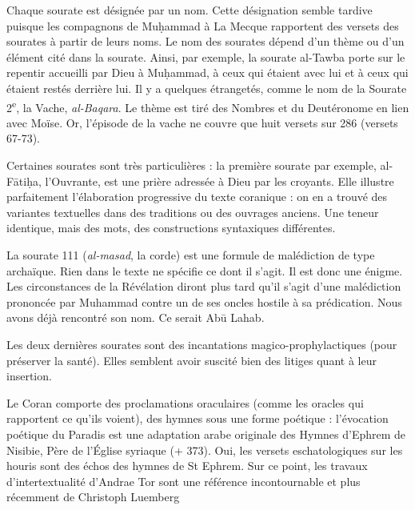 
Chaque sourate est désignée par un nom. Cette désignation semble tardive
puisque les compagnons de Muḥammad à La Mecque rapportent des versets
des sourates à partir de leurs noms. Le nom des sourates dépend d'un
thème ou d'un élément cité dans la sourate. Ainsi, par exemple, la
sourate al-Tawba porte sur le repentir accueilli par Dieu à Muḥammad, à
ceux qui étaient avec lui et à ceux qui étaient restés derrière lui. Il
y a quelques étrangetés, comme le nom de la Sourate
2\textsuperscript{e}, la Vache, \emph{al-Baqara}. Le thème est tiré des
Nombres et du Deutéronome en lien avec Moïse. Or, l'épisode de la vache
ne couvre que huit versets sur 286 (versets 67-73).


Certaines sourates sont très particulières : la première sourate par
exemple, al-Fātiḥa, l'Ouvrante, est une prière adressée à Dieu par les
croyants. Elle illustre parfaitement l'élaboration progressive du texte
coranique : on en a trouvé des variantes textuelles dans des traditions
ou des ouvrages anciens. Une teneur identique, mais des mots, des
constructions syntaxiques différentes.

La sourate 111 (\emph{al-masad}, la corde) est une formule de
malédiction de type archaïque. Rien dans le texte ne spécifie ce dont il
s'agit. Il est donc une énigme. Les circonstances de la Révélation
diront plus tard qu'il s'agit d'une malédiction prononcée par Muhammad
contre un de ses oncles hostile à sa prédication. Nous avons déjà
rencontré son nom. Ce serait Abū Lahab.

Les deux dernières sourates sont des incantations magico-prophylactiques
(pour préserver la santé). Elles semblent avoir suscité bien des litiges
quant à leur insertion.

Le Coran comporte des proclamations oraculaires (comme les oracles qui
rapportent ce qu'ils voient), des hymnes sous une forme poétique :
l'évocation poétique du Paradis est une adaptation arabe originale des
Hymnes d'Ephrem de Nisibie, Père de l'Église syriaque (+ 373). Oui, les
versets eschatologiques sur les houris sont des échos des hymnes de St
Ephrem. Sur ce point, les travaux d'intertextualité d'Andrae Tor sont
une référence incontournable et plus récemment de Christoph
Luemberg

